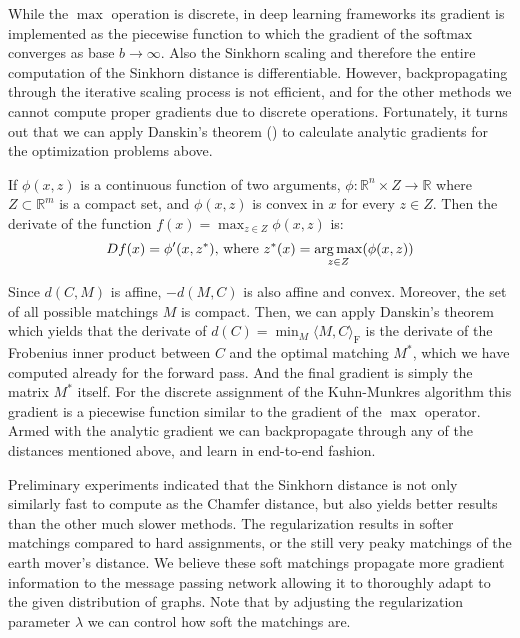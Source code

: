 While the $\max$ operation is discrete, in deep learning frameworks its gradient is implemented as the piecewise function to which the gradient of the $\text{softmax}$ converges as base $b \to \infty$. Also the Sinkhorn scaling and therefore the entire computation of the Sinkhorn distance is differentiable. However, backpropagating through the iterative scaling process is not efficient, and for the other methods we cannot compute proper gradients due to discrete operations. Fortunately, it turns out that we can apply Danskin's theorem (\citealp{danskin1967}) to calculate analytic gradients for the optimization problems above.
\begin{theorem}
     If $\phi(x,z)$ is a continuous function of two arguments, $\phi: {\mathbb R}^n \times Z \rightarrow {\mathbb R}$ where $Z \subset {\mathbb R}^m$ is a compact set, and  $\phi(x,z)$ is convex in $x$ for every $z \in Z$.
     Then the derivate of the function $f(x) = \max_{z \in Z} \phi(x,z)$ is:
     \begin{equation}
          D f(x) = \phi'(x,z^*)  \text{, where } z^*(x) = \operatorname*{arg\,max}_{z \in Z}(\phi(x,z))
     \end{equation}
\end{theorem}
Since $d(C, M)$ is affine, $-d(M,C)$ is also affine and convex. Moreover, the set of all possible matchings $M$ is compact. Then, we can apply Danskin's theorem which yields that the derivate of $d(C) = \min_M \langle M, C \rangle_\mathrm{F}$ is the derivate of the Frobenius inner product between $C$ and the optimal matching $M^*$, which we have computed already for the forward pass. And the final gradient is simply the matrix $M^*$ itself. For the discrete assignment of the Kuhn-Munkres algorithm this gradient is a piecewise function similar to the gradient of the $\max$ operator. Armed with the analytic gradient we can backpropagate through any of the distances mentioned above, and learn in end-to-end fashion.

Preliminary experiments indicated that the Sinkhorn distance is not only similarly fast to compute as the Chamfer distance, but also yields better results than the other much slower methods. The regularization results in softer matchings compared to hard assignments, or the still very peaky matchings of the earth mover's distance. We believe these soft matchings propagate more gradient information to the message passing network allowing it to thoroughly adapt to the given distribution of graphs. Note that by adjusting the regularization parameter $\lambda$ we can control how soft the matchings are.

